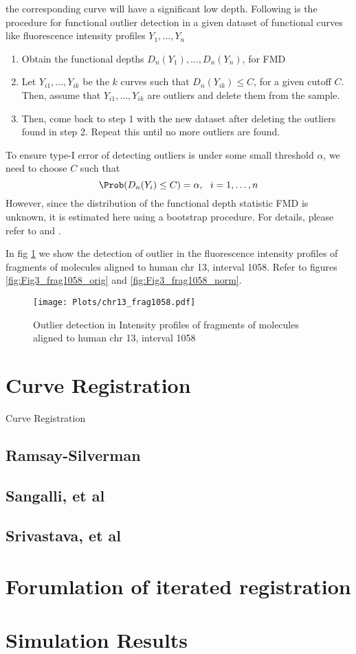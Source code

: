 the corresponding curve will have a significant low depth. Following is the procedure for functional outlier detection in a given dataset of functional curves like fluorescence intensity profiles
$Y_1, \dots, Y_n$
\begin{enumerate}
\item Obtain the functional depths $D_n(Y_1), \dots, D_n(Y_n)$, for FMD
\item Let $Y_{i1}, \dots, Y_{ik}$ be the $k$ curves such that $D_n(Y_{ik}) \leq C$, for a given cutoff $C$. Then, assume that $Y_{i1}, \dots, Y_{ik}$ are outliers and delete them from the sample.
\item Then, come back to step 1 with the new dataset after deleting the outliers found in step 2. Repeat this until no more outliers are found.
\end{enumerate}
To ensure type-I error of detecting outliers is under some small threshold $\alpha$, we need to choose $C$ such that
\[ \Prob(D_n(Y_i) \leq C) = \alpha,\ \ i = 1, \dots, n\]
However, since the distribution of the functional depth statistic FMD is unknown, it is estimated here using a bootstrap procedure. For details, please refer to \cite{Febrero-Bande_etal_2007_Environmetrics} and \cite{Febrero-Bande_delaFuente_2012_JSS}. 

In fig \ref{fig:Fig3_frag1058_outlier} we show the detection of outlier in the fluorescence intensity profiles of fragments of molecules aligned to human chr 13, interval 1058. Refer to figures \ref{fig:Fig3_frag1058_orig} and \ref{fig:Fig3_frag1058_norm}.
\begin{figure}[H]
\begin{center}
\texttt{[image: Plots/chr13\_frag1058.pdf]}
\end{center}
\caption{Outlier detection in Intensity profiles of fragments of molecules aligned to human chr 13, interval 1058}
\label{fig:Fig3_frag1058_outlier}
\end{figure}


\section{Curve Registration} \label{Ch3_Regist}
Curve Registration

\subsection{Ramsay-Silverman}
\subsection{Sangalli, et al}
\subsection{Srivastava, et al}

\section{Forumlation of iterated registration}

\section{Simulation Results}


